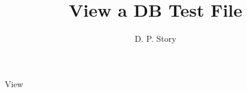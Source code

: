\documentclass[12pt]{article}
\title[ViewDB]{View a DB Test File}
\author{D. P. Story}
\begin{document}
\begin{exam}{View}



\end{exam}
\end{document}
